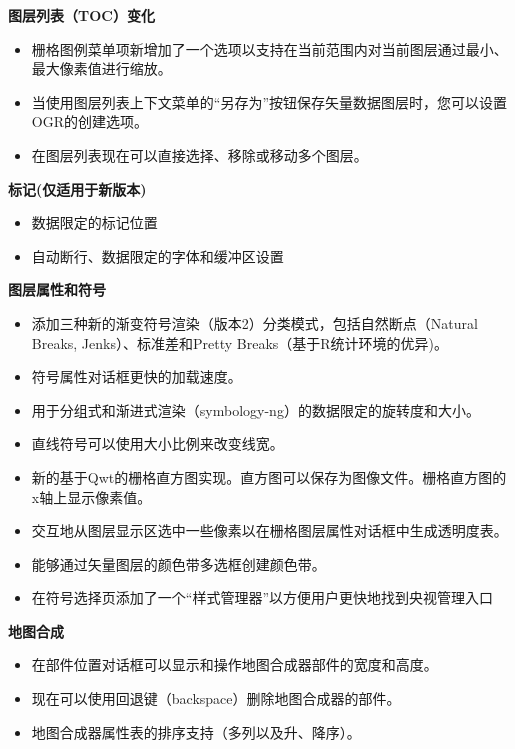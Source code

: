 \textbf{图层列表（TOC）变化}

\begin{itemize}[label=--]
\item 栅格图例菜单项新增加了一个选项以支持在当前范围内对当前图层通过最小、最大像素值进行缩放。
\item 当使用图层列表上下文菜单的“另存为”按钮保存矢量数据图层时，您可以设置OGR的创建选项。
\item 在图层列表现在可以直接选择、移除或移动多个图层。
\end{itemize}

\textbf{标记(仅适用于新版本)}

\begin{itemize}[label=--]
\item 数据限定的标记位置
\item 自动断行、数据限定的字体和缓冲区设置
\end{itemize}

\textbf{图层属性和符号}

\begin{itemize}[label=--]
\item 添加三种新的渐变符号渲染（版本2）分类模式，包括自然断点（Natural Breaks, Jenks）、标准差和Pretty Breaks（基于R统计环境的优异)。 
\item 符号属性对话框更快的加载速度。
\item 用于分组式和渐进式渲染（symbology-ng）的数据限定的旋转度和大小。
\item 直线符号可以使用大小比例来改变线宽。
\item 新的基于Qwt的栅格直方图实现。直方图可以保存为图像文件。栅格直方图的x轴上显示像素值。
\item 交互地从图层显示区选中一些像素以在栅格图层属性对话框中生成透明度表。
\item 能够通过矢量图层的颜色带多选框创建颜色带。
\item 在符号选择页添加了一个“样式管理器”以方便用户更快地找到央视管理入口
\end{itemize}

\textbf{地图合成}

\begin{itemize}[label=--]
\item 在部件位置对话框可以显示和操作地图合成器部件的宽度和高度。 
\item 现在可以使用回退键（backspace）删除地图合成器的部件。
\item 地图合成器属性表的排序支持（多列以及升、降序）。
\end{itemize}

